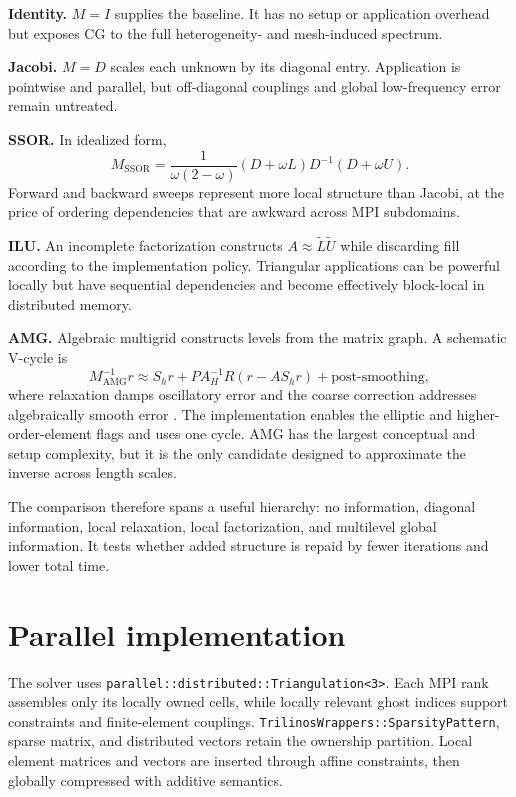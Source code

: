 \documentclass[10pt,a4paper]{article}
\begin{document}
\textbf{Identity.} $M=I$ supplies the baseline. It has no setup or application overhead but exposes
CG to the full heterogeneity- and mesh-induced spectrum.

\textbf{Jacobi.} $M=D$ scales each unknown by its diagonal entry. Application is pointwise and
parallel, but off-diagonal couplings and global low-frequency error remain untreated.

\textbf{SSOR.} In idealized form,
\begin{equation}
 M_{\mathrm{SSOR}}=\frac{1}{\omega(2-\omega)}(D+\omega L)D^{-1}(D+\omega U).
\end{equation}
Forward and backward sweeps represent more local structure than Jacobi, at the price of ordering
dependencies that are awkward across MPI subdomains.

\textbf{ILU.} An incomplete factorization constructs $A\approx\widetilde L\widetilde U$ while
discarding fill according to the implementation policy. Triangular applications can be powerful
locally but have sequential dependencies and become effectively block-local in distributed memory.

\textbf{AMG.} Algebraic multigrid constructs levels from the matrix graph. A schematic V-cycle is
\begin{equation}
 M_{\mathrm{AMG}}^{-1}r\approx S_h r
 +P A_H^{-1}R(r-AS_hr)+\text{post-smoothing},
\end{equation}
where relaxation damps oscillatory error and the coarse correction addresses algebraically smooth
error \cite{trottenberg2001}. The implementation enables the elliptic and higher-order-element
flags and uses one cycle. AMG has the largest conceptual and setup complexity, but it is the only
candidate designed to approximate the inverse across length scales.

The comparison therefore spans a useful hierarchy: no information, diagonal information, local
relaxation, local factorization, and multilevel global information. It tests whether added structure
is repaid by fewer iterations and lower total time.

\newpage
\section{Parallel implementation}
The solver uses \texttt{parallel::distributed::Triangulation<3>}. Each MPI rank assembles only its
locally owned cells, while locally relevant ghost indices support constraints and finite-element
couplings. \texttt{TrilinosWrappers::SparsityPattern}, sparse matrix, and distributed vectors retain
the ownership partition. Local element matrices and vectors are inserted through affine constraints,
then globally compressed with additive semantics.
\end{document}
